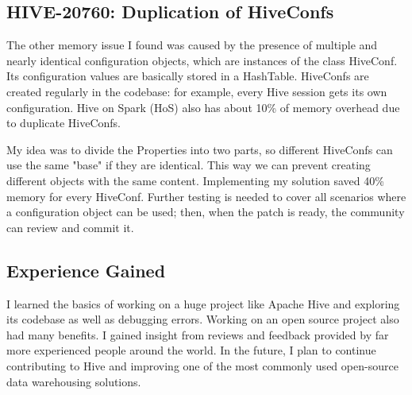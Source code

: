 \subsection{HIVE-20760: Duplication of HiveConfs}
The other memory issue I found was caused by the presence of multiple and nearly identical configuration objects, which are instances of the class HiveConf. Its configuration values are basically stored in a HashTable. HiveConfs are created regularly in the codebase: for example, every Hive session gets its own configuration. Hive on Spark (HoS) also has about 10\% of memory overhead due to duplicate HiveConfs. 

My idea was to divide the Properties into two parts, so different HiveConfs can use the same "base" if they are identical. This way we can prevent creating different objects with the same content. Implementing my solution saved 40\% memory for every HiveConf. Further testing is needed to cover all scenarios where a configuration object can be used; then, when the patch is ready, the community can review and commit it.

\subsection{Experience Gained }
I learned the basics of working on a huge project like Apache Hive and exploring its codebase as well as debugging errors. Working on an open source project also had many benefits. I gained insight from reviews and feedback provided by far more experienced people around the world. In the future, I plan to continue contributing to Hive and improving one of the most commonly used open-source data warehousing solutions.